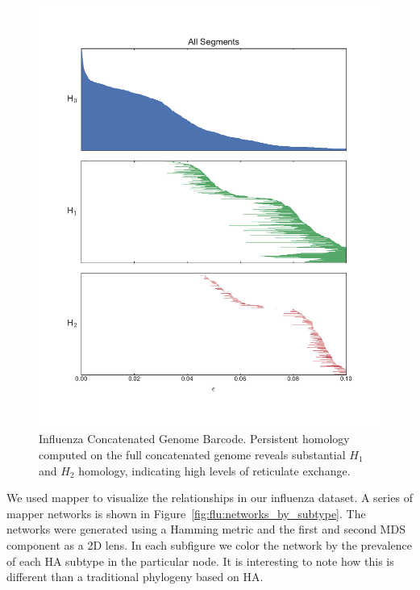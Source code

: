 \begin{figure}
\centering
\includegraphics[]{fig/influenza/flu_concat_barcode.pdf}
\caption[Influenza Concatenated Genome Barcode]{Influenza Concatenated Genome Barcode. Persistent homology computed on the full concatenated genome reveals substantial $H_1$ and $H_2$ homology, indicating high levels of reticulate exchange.}
\label{fig:flu:concatenated_genome_barcode}
\end{figure}

We used mapper to visualize the relationships in our influenza dataset.
A series of mapper networks is shown in Figure~\ref{fig:flu:networks_by_subtype}.
The networks were generated using a Hamming metric and the first and second MDS component as a 2D lens.
In each subfigure we color the network by the prevalence of each HA subtype in the particular node.
It is interesting to note how this is different than a traditional phylogeny based on HA.

